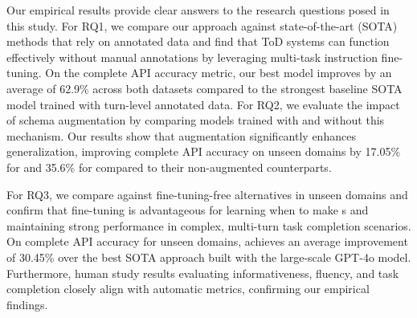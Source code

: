 



Our empirical results provide clear answers to the research questions posed in this study. For RQ1, we compare our approach against state-of-the-art (SOTA) methods that rely on annotated data and find that ToD systems can function effectively without manual annotations by leveraging multi-task instruction fine-tuning. 
On the complete API accuracy metric, our best model improves by an average of 62.9\% across both datasets compared to the strongest baseline SOTA model trained with turn-level annotated data.
For RQ2, we evaluate the impact of schema augmentation by comparing models trained with and without this mechanism. Our results show that augmentation significantly enhances {\ood} generalization, improving complete API accuracy on unseen domains by 17.05\% for {\flan} and 35.6\% for {\llamai} compared to their non-augmented counterparts.


For RQ3, we compare {\oursys} against fine-tuning-free alternatives in unseen domains and confirm that fine-tuning is advantageous for learning when to make {\apicall}s and maintaining strong {\ood} performance in complex, multi-turn task completion scenarios. 
On complete API accuracy for unseen domains, {\flan} achieves an average improvement of 30.45\% over the best SOTA approach built with the large-scale GPT-4o model.
Furthermore, human study results evaluating informativeness, fluency, and task completion closely align with automatic metrics, confirming our empirical findings. 



